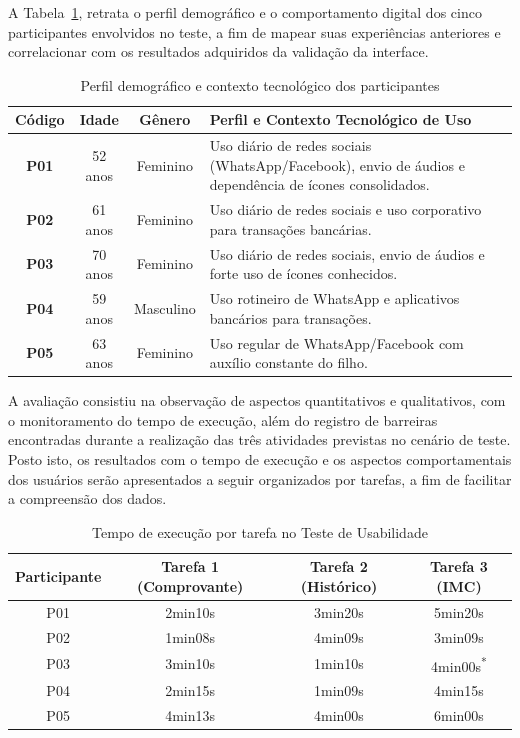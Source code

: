 \documentclass[12pt]{article}
\begin{document}
\begin{abstractp}
 A Tabela~\ref{tab:perfil_usuarios}, retrata o perfil demográfico e o comportamento digital dos cinco participantes envolvidos no teste, a fim de mapear suas experiências anteriores e correlacionar com os resultados adquiridos da validação da interface.  
 
\begin{table}[htbp]
\centering
\caption{Perfil demográfico e contexto tecnológico dos participantes}
\label{tab:perfil_usuarios}
\small
\begin{tabularx}{\textwidth}{|c|c|c|X|}
\hline
\textbf{Código} & \textbf{Idade} & \textbf{Gênero} & \textbf{Perfil e Contexto Tecnológico de Uso} \\ \hline
\textbf{P01} & 52 anos & Feminino & Uso diário de redes sociais (WhatsApp/Facebook), envio de áudios e dependência de ícones consolidados. \\ \hline
\textbf{P02} & 61 anos & Feminino & Uso diário de redes sociais e uso corporativo para transações bancárias. \\ \hline
\textbf{P03} & 70 anos & Feminino & Uso diário de redes sociais, envio de áudios e forte uso de ícones conhecidos. \\ \hline
\textbf{P04} & 59 anos & Masculino & Uso rotineiro de WhatsApp e aplicativos bancários para transações. \\ \hline
\textbf{P05} & 63 anos & Feminino & Uso regular de WhatsApp/Facebook com auxílio constante do filho.  \\ \hline
\end{tabularx}
\end{table}

A avaliação consistiu na observação de aspectos quantitativos e qualitativos, com o monitoramento do tempo de execução, além do registro de barreiras encontradas durante a realização das três atividades previstas no cenário de teste. Posto isto, os resultados com o tempo de execução e os aspectos comportamentais dos usuários serão apresentados a seguir organizados por tarefas, a fim de facilitar a compreensão dos dados. 

\begin{table}[htbp]
\centering
\footnotesize
\caption{Tempo de execução por tarefa no Teste de Usabilidade}
\label{tab:teste_usabilidade}
\begin{tabular}{|c|c|c|c|}
\hline
\textbf{Participante} & \textbf{Tarefa 1 (Comprovante)} & \textbf{Tarefa 2 (Histórico)} & \textbf{Tarefa 3 (IMC)} \\
\hline
P01 & 2min10s & 3min20s & 5min20s \\
\hline
P02 & 1min08s & 4min09s & 3min09s \\
\hline
P03 & 3min10s & 1min10s & 4min00s\textsuperscript{*} \\
\hline
P04 & 2min15s & 1min09s & 4min15s \\
\hline
P05 & 4min13s & 4min00s & 6min00s \\
\hline
\end{tabular}


\end{table}
\end{abstractp}
\end{document}
